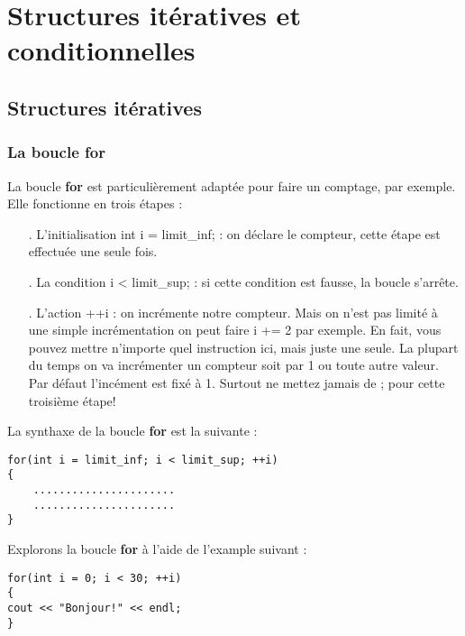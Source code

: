 \documentclass[a4paper, oneside,11pt]{book}
\begin{document}
\chapter{Structures it\'eratives et conditionnelles}

\pagestyle{fancy}
\renewcommand{\chaptermark}[1]{\markboth{#1}{}}
 \rhead{\thepage}
\section{Structures it\'eratives}

\subsection{La boucle for}

La boucle \textbf{for} est particuli\`erement adapt\'ee pour faire un comptage, par exemple. Elle fonctionne en trois \'etapes :

\begin{itemize}
\item[\Huge.] L'initialisation int i = limit\_inf; : on d\'eclare le compteur, cette \'etape est effectu\'ee une seule fois.
\item[\Huge.] La condition i < limit\_sup; : si cette condition est fausse, la boucle s'arr\^ete.
\item[\Huge.] L'action ++i : on incr\'emente notre compteur. Mais on n'est pas limit\'e \`a une simple
incr\'ementation on peut faire i += 2 par exemple. En fait, vous pouvez mettre n'importe quel
instruction ici, mais juste une seule. La plupart du temps on va incr\'ementer un compteur soit par 1 ou toute autre  valeur. Par d\'efaut l'inc\'ement est fix\'e \`a 1.
Surtout ne mettez jamais de ; pour cette troisi\`eme \'etape!
\end{itemize}

La synthaxe de la boucle \textbf{for} est la suivante :

\begin{lstlisting}
for(int i = limit_inf; i < limit_sup; ++i)
{
    ......................
    ......................
}

\end{lstlisting}

Explorons la boucle \textbf{for} \`a l'aide de l'example suivant :


\begin{lstlisting}
for(int i = 0; i < 30; ++i)
{
cout << "Bonjour!" << endl;
}

\end{lstlisting}
\end{document}
